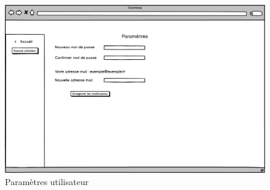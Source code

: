     \begin{figure}[H]
        \centering
        \includegraphics[width=\textwidth]{figures/Parametre.png}
            \caption{Paramètres utilisateur}
            \label{fig:utilisateur_parametre}
    \end{figure}